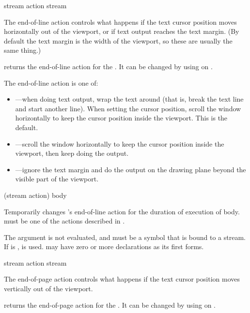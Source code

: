  {stream}
 {action stream}

The end-of-line action controls what happens if the text cursor position moves
horizontally out of the viewport, or if text output reaches the text margin.
(By default the text margin is the width of the viewport, so these are usually
the same thing.)

 returns the end-of-line action for the
 .  It can be changed by using
 on .

The end-of-line action is one of: 

\begin{itemize}
\item {}---when doing text output, wrap the text around (that is, break
the text line and start another line).  When setting the cursor position, scroll
the window horizontally to keep the cursor position inside the viewport.  This
is the default.

\item {}---scroll the window horizontally to keep the cursor
position inside the viewport, then keep doing the output.

\item {}---ignore the text margin and do the output on the drawing
plane beyond the visible part of the viewport.
\end{itemize}

 {(stream action) \body body}

Temporarily changes 's end-of-line action for the duration of
execution of body.   must be one of the actions described in
.

The  argument is not evaluated, and must be a symbol that is bound
to a stream.  If  is ,  is used.
 may have zero or more declarations as its first forms.


 {stream}
 {action stream}

The end-of-page action controls what happens if the text cursor position moves
vertically out of the viewport.

 returns the end-of-page action for the
 .  It can be changed by using
 on .


